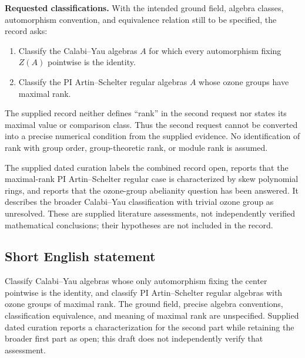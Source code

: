 \documentclass[11pt]{article}
\begin{document}
\textbf{Requested classifications.} With the intended ground field, algebra classes, automorphism convention, and equivalence relation still to be specified, the record asks:
\begin{enumerate}
\item Classify the Calabi--Yau algebras \(A\) for which every automorphism fixing \(Z(A)\) pointwise is the identity.
\item Classify the PI Artin--Schelter regular algebras \(A\) whose ozone groups have maximal rank.
\end{enumerate}
The supplied record neither defines ``rank'' in the second request nor states its maximal value or comparison class. Thus the second request cannot be converted into a precise numerical condition from the supplied evidence. No identification of rank with group order, group-theoretic rank, or module rank is assumed.

The supplied dated curation labels the combined record open, reports that the maximal-rank PI Artin--Schelter regular case is characterized by skew polynomial rings, and reports that the ozone-group abelianity question has been answered. It describes the broader Calabi--Yau classification with trivial ozone group as unresolved. These are supplied literature assessments, not independently verified mathematical conclusions; their hypotheses are not included in the record.
\subsection{Short English statement}
Classify Calabi--Yau algebras whose only automorphism fixing the center pointwise is the identity, and classify PI Artin--Schelter regular algebras with ozone groups of maximal rank. The ground field, precise algebra conventions, classification equivalence, and meaning of maximal rank are unspecified. Supplied dated curation reports a characterization for the second part while retaining the broader first part as open; this draft does not independently verify that assessment.
\end{document}
